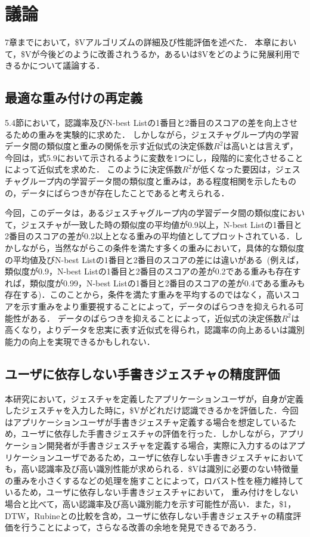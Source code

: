 \chapter{議論}
7章までにおいて，\$Vアルゴリズムの詳細及び性能評価を述べた．
本章において，\$Vが今後どのように改善されうるか，あるいは\$Vをどのように発展利用できるかについて議論する．

\section{最適な重み付けの再定義}
5.4節において，認識率及びN-best Listの1番目と2番目のスコアの差を向上させるための重みを実験的に求めた．
しかしながら，ジェスチャグループ内の学習データ間の類似度と重みの関係を示す近似式の決定係数$R^2$は高いとは言えず，今回は，式5.9において示されるように変数を1つにし，段階的に変化させることによって近似式を求めた．
このように決定係数$R^2$が低くなった要因は，ジェスチャグループ内の学習データ間の類似度と重みは，ある程度相関を示したものの，データにばらつきが存在したことであると考えられる．

今回，このデータは，あるジェスチャグループ内の学習データ間の類似度において，ジェスチャが一致した時の類似度の平均値が0.9以上，N-best Listの1番目と2番目のスコアの差が0.2以上となる重みの平均値としてプロットされている．しかしながら，当然ながらこの条件を満たす多くの重みにおいて，具体的な類似度の平均値及びN-best Listの1番目と2番目のスコアの差には違いがある~(例えば，類似度が0.9，N-best Listの1番目と2番目のスコアの差が0.2である重みも存在すれば，類似度が0.99，N-best Listの1番目と2番目のスコアの差が0.4である重みも存在する)．このことから，条件を満たす重みを平均するのではなく，高いスコアを示す重みをより重要視することによって，データのばらつきを抑えられる可能性がある．
データのばらつきを抑えることによって，近似式の決定係数$R^2$は高くなり，よりデータを忠実に表す近似式を得られ，認識率の向上あるいは識別能力の向上を実現できるかもしれない．


\section{ユーザに依存しない手書きジェスチャの精度評価}
本研究において，ジェスチャを定義したアプリケーションユーザが，自身が定義したジェスチャを入力した時に，\$Vがどれだけ認識できるかを評価した．今回はアプリケーションユーザが手書きジェスチャ定義する場合を想定しているため，ユーザに依存した手書きジェスチャの評価を行った．しかしながら，アプリケーション開発者が手書きジェスチャを定義する場合，実際に入力するのはアプリケーションユーザであるため，ユーザに依存しない手書きジェスチャにおいても，高い認識率及び高い識別性能が求められる．\$Vは識別に必要のない特徴量の重みを小さくするなどの処理を施すことによって，ロバスト性を極力維持しているため，ユーザに依存しない手書きジェスチャにおいて，
重み付けをしない場合と比べて，高い認識率及び高い識別能力を示す可能性が高い．また，\$1，DTW，Rubineとの比較を含め，ユーザに依存しない手書きジェスチャの精度評価を行うことによって，さらなる改善の余地を発見できるであろう．


